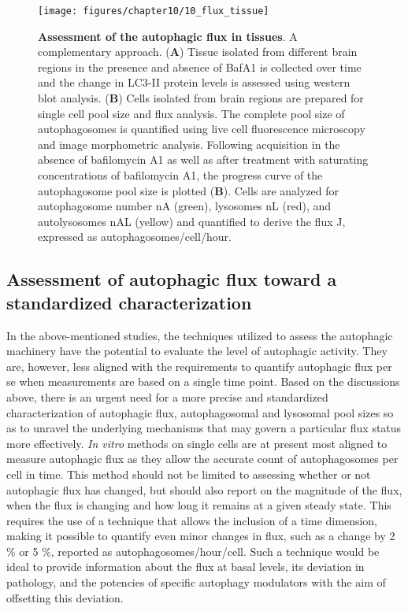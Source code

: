 \begin{figure}[!htbp]
  \texttt{[image: figures/chapter10/10\_flux\_tissue]}
  \caption[Assessment of the autophagic flux in tissues.]{\textbf{Assessment of the autophagic flux in tissues}. A complementary approach. (\textbf{A}) Tissue isolated from different brain regions in the presence and absence of BafA1 is collected over time and the change in LC3-II protein levels is assessed using western blot analysis. (\textbf{B}) Cells isolated from brain regions are prepared for single cell pool size and flux analysis. The complete pool size of autophagosomes is quantified using live cell fluorescence microscopy and image morphometric analysis. Following acquisition in the absence of bafilomycin A1 as well as after treatment with saturating concentrations of bafilomycin A1, the progress curve of the autophagosome pool size is plotted (\textbf{B}). Cells are analyzed for autophagosome number nA (green), lysosomes nL (red), and autolysosomes nAL (yellow) and quantified to derive the flux J, expressed as autophagosomes/cell/hour.}
  \label{fig:10_flux_tissue}
\end{figure}

\subsection{Assessment of autophagic flux  toward a standardized characterization}
In the above-mentioned studies, the techniques utilized to assess the autophagic machinery have the potential to evaluate the level of autophagic activity. They are, however, less aligned with the requirements to quantify autophagic flux per se when measurements are based on a single time point. Based on the discussions above, there is an urgent need for a more precise and standardized characterization of autophagic flux, autophagosomal and lysosomal pool sizes so as to unravel the underlying mechanisms that may govern a particular flux status more effectively. \textit{In vitro} methods on single cells are at present most aligned to measure autophagic flux as they allow the accurate count of autophagosomes per cell in time. This method should not be limited to assessing whether or not autophagic flux has changed, but should also report on the magnitude of the flux, when the flux is changing and how long it remains at a given steady state. This requires the use of a technique that allows the inclusion of a time dimension, making it possible to quantify even minor changes in flux, such as a change by 2 \% or 5 \%, reported as autophagosomes/hour/cell. Such a technique would be ideal to provide information about the flux at basal levels, its deviation in pathology, and the potencies of specific autophagy modulators with the aim of offsetting this deviation. 

